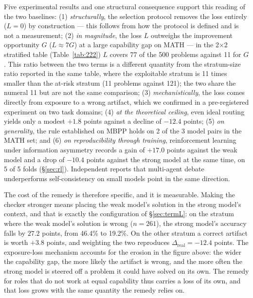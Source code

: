 \documentclass[11pt,a4paper]{article}
\newcommand{\dhonest}{\Delta_{\mathrm{real}}}
\begin{document}
Five experimental results and one structural consequence support this reading of the two baselines: (1)
\emph{structurally}, the selection protocol removes the loss entirely ($L=0$) by construction --- this
follows from how the protocol is defined and is not a measurement; (2) \emph{in magnitude}, the loss $L$
outweighs the improvement opportunity $G$ ($L \approx 7G$) at a large capability gap on MATH --- in the
2$\times$2 stratified table (Table~\ref{tab:222}) $L$ covers 77 of the 500 problems against 11 for $G$.
This ratio between the two terms is a different quantity from the stratum-size ratio reported in the same
table, where the exploitable stratum is 11 times smaller than the at-risk stratum (11 problems against
121); the two share the numeral 11 but are not the same comparison; (3) \emph{mechanistically}, the loss
comes directly from exposure to a wrong artifact, which we confirmed in a pre-registered experiment on two
task domains; (4) \emph{at the theoretical ceiling}, even ideal routing yields only a modest $+1.8$ points
against a decline of $-12.4$ points; (5) \emph{on generality}, the rule established on MBPP holds on 2 of
the 3 model pairs in the MATH set; and (6) \emph{on reproducibility through training}, reinforcement
learning under information asymmetry records a gain of $+17.0$ points against the weak model and a drop of
$-10.4$ points against the strong model at the same time, on 5 of 5 folds (\S\ref{sec:rl}). Independent
reports that multi-agent debate underperforms self-consistency on small models \cite{chen2025debate} point
in the same direction.

The cost of the remedy is therefore specific, and it is measurable. Making the checker stronger means
placing the weak model's solution in the strong model's context, and that is exactly the configuration of
\S\ref{sec:termL}: on the stratum where the weak model's solution is wrong ($n=261$), the strong model's
accuracy falls by $27.2$ points, from 46.4\% to 19.2\%. On the other stratum a correct artifact is worth
$+3.8$ points, and weighting the two reproduces $\dhonest = -12.4$ points. The exposure-loss mechanism
accounts for the erosion in the figure above: the wider the capability gap, the more likely the artifact
is wrong, and the more often the strong model is steered off a problem it could have solved on its own.
The remedy for roles that do not work at equal capability thus carries a loss of its own, and that loss
grows with the same quantity the remedy relies on.
\end{document}
